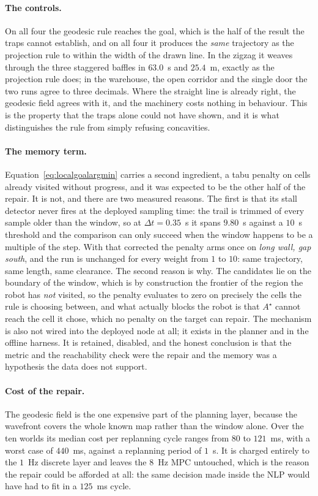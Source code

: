 \documentclass[11pt,a4paper]{article}
\newcommand{\astar}{$A^\star$}
\begin{document}
\paragraph{The controls.} On all four the geodesic rule reaches the goal, which is the half of the result
the traps cannot establish, and on all four it produces the \emph{same} trajectory as the projection rule to
within the width of the drawn line. In the zigzag it weaves through the three staggered baffles in
$63.0$~s and $25.4$~m, exactly as the projection rule does; in the warehouse, the open corridor and the
single door the two runs agree to three decimals. Where the straight line is already right, the geodesic
field agrees with it, and the machinery costs nothing in behaviour. This is the property that the traps
alone could not have shown, and it is what distinguishes the rule from simply refusing concavities.

\paragraph{The memory term.} Equation~\eqref{eq:localgoalargmin} carries
a second ingredient, a tabu penalty on cells already visited without progress, and it was expected to be the
other half of the repair. It is not, and there are two measured reasons. The first is that its stall
detector never fires at the deployed sampling time: the trail is trimmed of every sample older than the
window, so at $\Delta t=0.35$~s it spans $9.80$~s against a $10$~s threshold and the comparison can only
succeed when the window happens to be a multiple of the step. With that corrected the penalty arms once on
\emph{long wall, gap south}, and the run is unchanged for every weight from $1$ to $10$: same trajectory,
same length, same clearance. The second reason is why. The candidates lie on the boundary of the window,
which is by construction the frontier of the region the robot has \emph{not} visited, so the penalty
evaluates to zero on precisely the cells the rule is choosing between, and what actually blocks the robot is
that \astar{} cannot reach the cell it chose, which no penalty on the target can repair. The mechanism is
also not wired into the deployed node at all; it exists in the planner and in the offline harness. It is
retained, disabled, and the honest conclusion is that the metric and the reachability check were the repair
and the memory was a hypothesis the data does not support.
\paragraph{Cost of the repair.} The geodesic field is the one expensive part of the planning layer,
because the wavefront covers the whole known map rather than the window alone. Over the ten worlds its
median cost per replanning cycle ranges from $80$ to $121$~ms, with a worst case of $440$~ms, against a
replanning period of $1$~s. It is charged entirely to the $1$~Hz discrete layer and leaves the $8$~Hz MPC
untouched, which is the reason the repair could be afforded at all: the same decision made inside the NLP
would have had to fit in a $125$~ms cycle.
\end{document}
